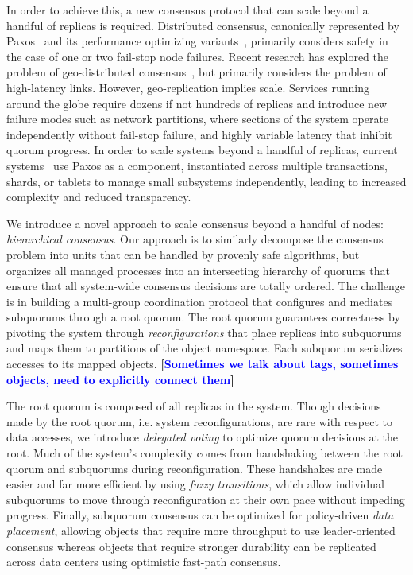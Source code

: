 \documentclass[11pt,conference]{IEEEtran}
\newcommand{\hc}{hierarchical consensus\xspace}
\newcommand{\sub}{subquorum\xspace}
\newcommand{\subs}{subquorums\xspace}
\newcommand{\roo}{root quorum\xspace}
\renewcommand{\pjk}[1]{{\bf
    [\marginpar[\hbox{{\textcolor{blue}{pjk}}\raisebox{0ex}{\Huge $\rightarrow$}}]%
{\hbox{\raisebox{0ex}{\Huge $\leftarrow$}{\textcolor{blue}{pjk}}}}\textcolor{blue}{#1}]}}
\begin{document}
In order to achieve this, a new consensus protocol that can scale beyond a handful of
replicas is required.
Distributed consensus, canonically represented by Paxos~\cite{paxos_simple} and its
performance optimizing
variants~\cite{fast_paxos,multicoordinated_paxos,spaxos,generalized_paxos}, primarily
considers safety in the case of one or two fail-stop node failures.
Recent research has explored the problem of geo-distributed
consensus~\cite{mencius,epaxos}, but primarily considers the problem of high-latency
links.
However, geo-replication implies scale.
Services running around the globe require dozens if not hundreds of replicas and
introduce new failure modes such as network partitions, where sections of the system
operate independently without fail-stop failure, and highly variable latency that
inhibit quorum progress.
In order to scale systems beyond a handful of replicas, current
systems~\cite{spanner,scatter,mdcc,calvinfs} use Paxos as a component, instantiated
across multiple transactions, shards, or tablets to manage small subsystems
independently, leading to increased complexity and reduced transparency.

We introduce a novel approach to scale consensus beyond a handful of nodes:
\emph{\hc}.
Our approach is to similarly decompose the consensus problem into units that can be
handled by provenly safe algorithms, but organizes all managed processes into an
intersecting hierarchy of quorums that ensure that all system-wide consensus decisions
are totally ordered.
The challenge is in building a multi-group coordination protocol that configures and
mediates \subs through a \roo.
The \roo guarantees correctness by pivoting the system through \emph{reconfigurations}
that place replicas into \subs and maps them to partitions of the
object namespace. Each \sub serializes accesses to its mapped objects.
\pjk{Sometimes we talk about tags, sometimes objects, need to
  explicitly connect them}

The \roo is composed of all replicas in the system.
Though decisions made by the \roo, i.e. system reconfigurations, are rare
with respect to data accesses, we introduce \emph{delegated voting} to optimize quorum
decisions at the root.
Much of the system's complexity comes from handshaking between the \roo and \subs during
reconfiguration.
These handshakes are made easier and far more efficient by using \emph{fuzzy transitions},
which allow individual \subs to move through reconfiguration at their own pace without
impeding progress.
Finally, subquorum consensus can be optimized for policy-driven \emph{data placement},
allowing objects that require more throughput to use leader-oriented consensus whereas
objects that require stronger durability can be replicated across data centers using
optimistic fast-path consensus.
\end{document}
